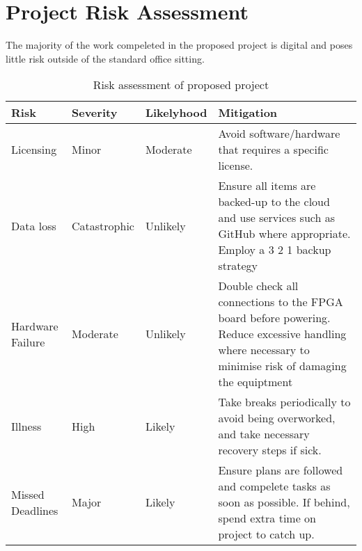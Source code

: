 \section{Project Risk Assessment}

The majority of the work compeleted in the proposed project is digital and poses little risk outside of the standard office sitting. 

\begin{table}[hbt!]
    \centering%
        \begin{tabularx}{\textwidth}{ lllX }
            \hline
            Risk       & Severity & Likelyhood & Mitigation  \\ \hline

            Licensing & Minor & Moderate & Avoid software/hardware that requires a specific license. \\
            Data loss & Catastrophic & Unlikely & Ensure all items are backed-up to the cloud and use services such as GitHub where appropriate. Employ a 3 2 1 backup strategy \\
            Hardware Failure & Moderate & Unlikely & Double check all connections to the FPGA board before powering. Reduce excessive handling where necessary to minimise risk of damaging the equiptment \\
            Illness & High & Likely & Take breaks periodically to avoid being overworked, and take necessary recovery steps if sick. \\
            Missed Deadlines & Major & Likely & Ensure plans are followed and compelete tasks as soon as possible. If behind, spend extra time on project to catch up.\\
    
            \hline
            \end{tabularx}
    \caption{ Risk assessment of proposed project}\label{table:milestones}
    \end{table}
     
    